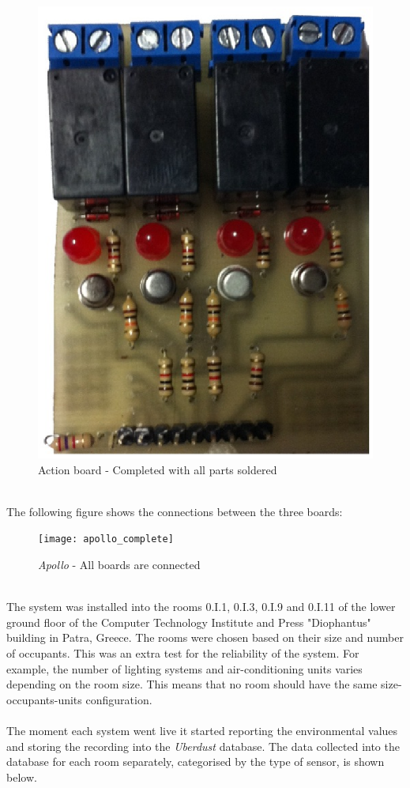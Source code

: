\documentclass[12pt,a4paper]{report}
\begin{document}
\begin{figure}[H]
\centering
	\includegraphics*[scale=0.2]{action_brd_complete}
	\caption{Action board - Completed with all parts soldered}
	\label{Action_brd_complete}
\end{figure}
\ \\
%
The following figure shows the connections between the three boards:
\ \\
\begin{figure}[H]
\centering
	\texttt{[image: apollo\_complete]}
	\caption{\emph{Apollo} - All boards are connected}
	\label{all_brd_connected}
\end{figure}
\ \\
%
The system was installed into the rooms 0.I.1, 0.I.3, 0.I.9 and 0.I.11 of the lower ground floor of the Computer Technology Institute and Press "Diophantus" building in Patra, Greece.
The rooms were chosen based on their size and number of occupants.
This was an extra test for the reliability of the system.
For example, the number of lighting systems and air-conditioning units varies depending on the room size.
This means that no room should have the same size-occupants-units configuration. \\
\ \\
The moment each system went live it started reporting the environmental values and storing the recording into the \textit{Uberdust} database.
The data collected into the database for each room separately, categorised by the type of sensor, is shown below.\\
\ \\
%
\end{document}
